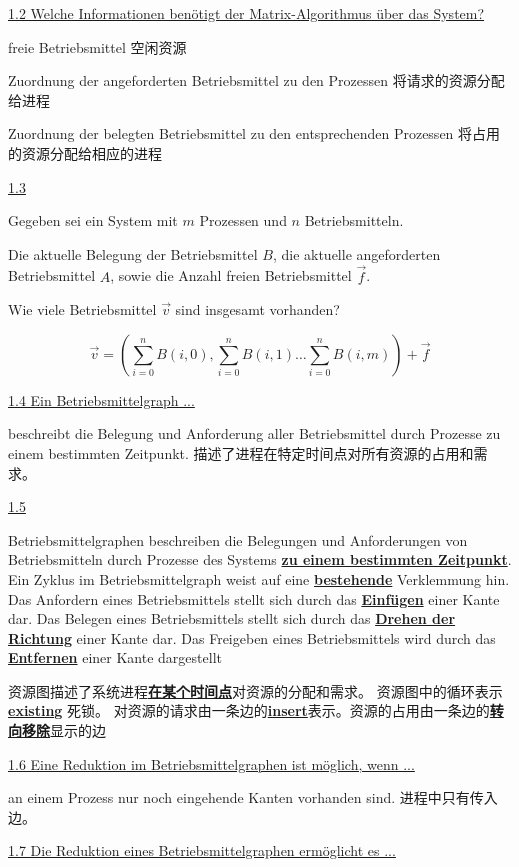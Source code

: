 \documentclass[fleqn]{article}
\begin{document}
\noindent\uline{1.2 Welche Informationen benötigt der Matrix-Algorithmus über das System?}

freie Betriebsmittel
空闲资源

Zuordnung der angeforderten Betriebsmittel zu den Prozessen
将请求的资源分配给进程

Zuordnung der belegten Betriebsmittel zu den entsprechenden Prozessen
将占用的资源分配给相应的进程

\noindent\uline{1.3}

Gegeben sei ein System mit $m$ Prozessen und $n$ Betriebsmitteln.

Die aktuelle Belegung der Betriebsmittel $B$, die aktuelle angeforderten Betriebsmittel $A$,
sowie die Anzahl freien Betriebsmittel $\vec{f}$. 

Wie viele Betriebsmittel $\vec{v}$ sind insgesamt vorhanden?

$$\vec{v} = (\sum^n_{i=0} B(i,0),\sum^n_{i=0} B(i,1)\dots\sum^n_{i=0} B(i,m))+\vec{f}$$

\noindent\uline{1.4 Ein Betriebsmittelgraph ...}

beschreibt die Belegung und Anforderung aller Betriebsmittel durch Prozesse zu einem bestimmten Zeitpunkt.
描述了进程在特定时间点对所有资源的占用和需求。

\noindent\uline{1.5}

Betriebsmittelgraphen beschreiben die Belegungen und Anforderungen von Betriebsmitteln 
durch Prozesse des Systems \uline{\textbf{zu einem bestimmten Zeitpunkt}}.
 Ein Zyklus im Betriebsmittelgraph weist auf eine \uline{\textbf{bestehende}} Verklemmung hin.
 Das Anfordern eines Betriebsmittels stellt sich durch das \uline{\textbf{Einfügen}} einer Kante dar. 
 Das Belegen eines Betriebsmittels stellt sich durch das \uline{\textbf{Drehen der Richtung}} einer Kante dar. 
 Das Freigeben eines Betriebsmittels wird durch das \uline{\textbf{Entfernen}} einer Kante dargestellt

资源图描述了系统进程\uline{\textbf{在某个时间点}}对资源的分配和需求。 资源图中的循环表示\uline{\textbf{existing}} 死锁。 对资源的请求由一条边的\uline{\textbf{insert}}表示。资源的占用由一条边的\uline{\textbf{转向}}\uline{\textbf{移除}}显示的边

\noindent\uline{1.6 Eine Reduktion im Betriebsmittelgraphen ist möglich, wenn ...}

an einem Prozess nur noch eingehende Kanten vorhanden sind.
进程中只有传入边。

\noindent\uline{1.7 Die Reduktion eines Betriebsmittelgraphen ermöglicht es ...}
\end{document}
